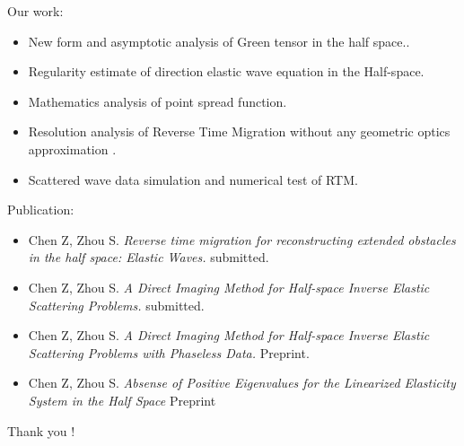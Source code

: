 \documentclass[cjk,8pt]{beamer}
\begin{document}
\begin{CJK*}{GBK}{kai}
\begin{frame}
Our work:
\begin{itemize}
\item New form and asymptotic analysis of Green tensor in the half space..
\item Regularity estimate of direction elastic wave equation in the Half-space.
\item Mathematics analysis of point spread function.
\item Resolution analysis of Reverse Time Migration without any geometric optics approximation .
\item Scattered wave data simulation and numerical test of RTM.
\end{itemize}
Publication:
\begin{itemize}
\item Chen Z, Zhou S. {\it Reverse time migration for reconstructing extended obstacles in the half space: Elastic Waves.} submitted.
\item Chen Z, Zhou S. {\it A Direct Imaging Method for Half-space Inverse Elastic Scattering Problems.} submitted.
\item Chen Z, Zhou S. {\it A Direct Imaging Method for Half-space Inverse Elastic Scattering Problems with Phaseless Data.} Preprint.
\item Chen Z, Zhou S. {\it Absense of Positive Eigenvalues for the Linearized Elasticity System in the Half
	Space} Preprint
\end{itemize}
\vspace{1cm}
\begin{flushright}
  \LARGE \textcolor[rgb]{1.00,0.00,0.00}{Thank you !}
\end{flushright}
\end{frame}

\end{CJK*}

%
\end{document}
